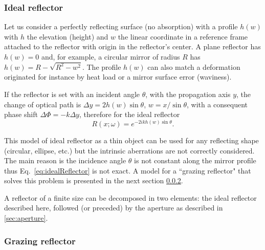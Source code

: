 \documentclass{iucr}
\begin{document}
\subsubsection{Ideal reflector}
\label{sec:idealReflector}

Let us consider a perfectly reflecting surface (no absorption) with a profile $h(w)$ with $h$ the elevation (height) and $w$ the linear coordinate in a reference frame attached to the reflector with origin in the reflector's center. A plane reflector has $h(w)=0$ and, for example, a circular mirror of radius $R$ has $h(w)=R-\sqrt{R^2 - w^2}$. The profile $h(w)$ can also match a deformation originated for instance by heat load or a mirror surface error (waviness).

If the reflector is set with an incident angle $\theta$, with the propagation axis $y$, the change of optical path is $\Delta y = 2 h(w) \sin \theta$, $w=x/\sin\theta$, with a consequent phase shift $\Delta \Phi = - k \Delta y $, therefore for the ideal reflector
\begin{equation}
\label{eq:idealReflector}
    R(x;\omega) = e^{-2 i k h(w) \sin \theta}.
\end{equation} 

This model of ideal reflector as a thin object  can be used for any reflecting shape (circular, ellipse, etc.) but the intrinsic aberrations are not correctly considered.  The main reason is the incidence angle $\theta$ is not constant along the mirror profile thus Eq.~\ref{eq:idealReflector} is not exact. A model for a ``grazing reflector" that solves this problem is presented in the next section \ref{sec:grazingReflector}.

A reflector of a finite size can be decomposed in two elements: the ideal reflector described here, followed (or preceded) by the aperture as described in \ref{sec:aperture}.

\subsubsection{Grazing reflector}
\label{sec:grazingReflector}
\end{document}

